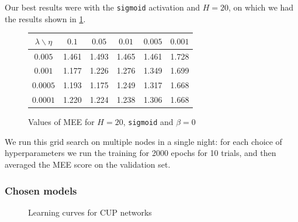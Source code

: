 Our best results were with the \texttt{sigmoid} activation and $H=20$, on which we had the results shown in \cref{fig:gridsearch}.

\begin{figure}
    \centering
    \begin{tabular}{|c||c|c|c|c|c|}
            \hline
              $\lambda \backslash \eta$ & $0.1$ & $0.05$ & $0.01$ & $0.005$ & $0.001$\\ \hline\hline
             $0.005$ & 1.461 & 1.493 & 1.465 & 1.461 & 1.728 \\ \hline
             $0.001$ & 1.177 & 1.226 & 1.276 & 1.349 & 1.699 \\ \hline
             $0.0005$ & 1.193 & 1.175 & 1.249 & 1.317 & 1.668 \\ \hline
             $0.0001$ & 1.220 & 1.224 & 1.238 & 1.306 & 1.668 \\ \hline
    \end{tabular}
    \caption{Values of MEE for $H=20$, \texttt{sigmoid} and $\beta=0$}
    \label{fig:gridsearch}
\end{figure}

We run this grid search on multiple nodes in a single night: for each choice of hyperparameters we run the training for 2000 epochs for 10 trials, and then averaged the MEE score on the validation set.

\subsubsection{Chosen models}


\begin{figure}
    \centering
    \caption{Learning curves for CUP networks}
\end{figure}


